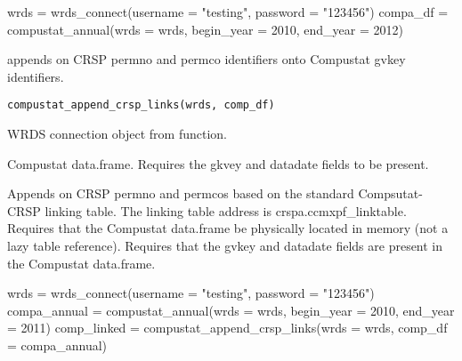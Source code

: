 \documentclass[a4paper]{book}
\begin{document}
%
\begin{Examples}
\begin{ExampleCode}
wrds = wrds_connect(username = "testing", password = "123456")
compa_df = compustat_annual(wrds = wrds, begin_year = 2010, end_year = 2012)
\end{ExampleCode}
\end{Examples}
%
\begin{Description}\relax
{} appends on CRSP permno and permco identifiers onto Compustat
gvkey identifiers.
\end{Description}
%
\begin{Usage}
\begin{verbatim}
compustat_append_crsp_links(wrds, comp_df)
\end{verbatim}
\end{Usage}
%
\begin{Arguments}
\begin{ldescription}
\item[\code{wrds}] WRDS connection object from  function.

\item[\code{comp\_df}] Compustat data.frame. Requires the gkvey and datadate fields to be present.
\end{ldescription}
\end{Arguments}
%
\begin{Details}\relax
Appends on CRSP permno and permcos based on the standard Compsutat-CRSP linking table. The
linking table address is crspa.ccmxpf\_linktable. Requires that the Compustat data.frame be
physically located in memory (not a lazy  table reference). Requires that the gvkey
and datadate fields are present in the Compustat data.frame.
\end{Details}
%
\begin{Examples}
\begin{ExampleCode}
wrds = wrds_connect(username = "testing", password = "123456")
compa_annual = compustat_annual(wrds = wrds, begin_year = 2010, end_year = 2011)
comp_linked = compustat_append_crsp_links(wrds = wrds, comp_df = compa_annual)
\end{ExampleCode}
\end{Examples}
\end{document}
